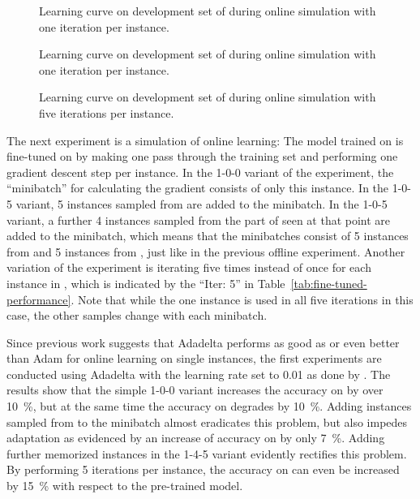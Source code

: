 \begin{figure}[p]
  \centering
  \resizebox{0.9\textwidth}{!}{}
  \caption[1-iter learning curve on \nlmfour{}]{Learning curve on development
    set of \nlmapsfour{} during online simulation with one iteration per
    instance.}
  \label{fig:online-1-v4-learning-curve}
\end{figure}

\begin{figure}[p]
  \centering
  \resizebox{0.9\textwidth}{!}{}
  \caption[1-iter learning curve on \nlmthree{}]{Learning curve on development
    set of \nlmapsthree{} during online simulation with one iteration per
    instance.}
  \label{fig:online-1-v3-learning-curve}
\end{figure}

\begin{figure}[h]
  \centering
  \resizebox{\textwidth}{!}{}
  \caption[5-Iter learning curve on \nlmfour{}]{Learning curve on development
    set of \nlmapsfour{} during online simulation with five iterations per
    instance.}
  \label{fig:online-5-v4-learning-curve}
\end{figure}

The next experiment is a simulation of online learning: The model trained on
\nlmapsthree{} is fine-tuned on \nlmapsfour{} by making one pass through the
\nlmfour{} training set and performing one gradient descent step per instance.
In the 1-0-0 variant of the experiment, the \enquote{minibatch} for calculating
the gradient consists of only this instance. In the 1-0-5 variant, 5 instances
sampled from \nlmapsthree{} are added to the minibatch. In the 1-0-5 variant, a
further 4 instances sampled from the part of \nlmfour{} seen at that point are
added to the minibatch, which means that the minibatches consist of 5 instances
from \nlmthree{} and 5 instances from \nlmfour{}, just like in the previous
offline experiment. Another variation of the experiment is iterating five times
instead of once for each instance in \nlmfour{}, which is indicated by the
\enquote{Iter: 5} in Table~\ref{tab:fine-tuned-performance}. Note that while the
one instance is used in all five iterations in this case, the other samples
change with each minibatch.

Since previous work suggests that Adadelta performs as good as
\parencite{peris-2017} or even better than \parencites{turchi-2017}{peris-2019}
Adam for online learning on single instances, the first experiments are
conducted using Adadelta with the learning rate set to \num{0.01} as done by
\textcite{peris-2019}. The results show that the simple 1-0-0 variant increases
the accuracy on \nlmfour{} by over \SI{10}{\%}, but at the same time the
accuracy on \nlmthree{} degrades by \SI{10}{\%}. Adding instances sampled from
\nlmthree{} to the minibatch almost eradicates this problem, but also impedes
adaptation as evidenced by an increase of accuracy on \nlmfour{} by only
\SI{7}{\%}. Adding further memorized \nlmfour{} instances in the 1-4-5 variant
evidently rectifies this problem. By performing 5 iterations per instance, the
accuracy on \nlmfour{} can even be increased by \SI{15}{\%} with respect to the
pre-trained model.

